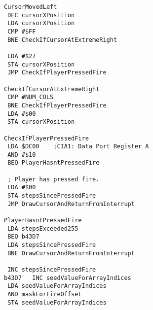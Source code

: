 \begin{minipage}[b]{0.33\linewidth}
\begin{lrbox}{\mybox}
\begin{lstlisting}[basicstyle=\ttfamily\tiny]
CursorMovedLeft   
 DEC cursorXPosition
 LDA cursorXPosition
 CMP #$FF
 BNE CheckIfCursorAtExtremeRight

 LDA #$27
 STA cursorXPosition
 JMP CheckIfPlayerPressedFire

CheckIfCursorAtExtremeRight   
 CMP #NUM_COLS
 BNE CheckIfPlayerPressedFire
 LDA #$00
 STA cursorXPosition

CheckIfPlayerPressedFire   
 LDA $DC00    ;CIA1: Data Port Register A
 AND #$10
 BEQ PlayerHasntPressedFire

 ; Player has pressed fire.
 LDA #$00
 STA stepsSincePressedFire
 JMP DrawCursorAndReturnFromInterrupt

PlayerHasntPressedFire   
 LDA stepsExceeded255
 BEQ b43D7
 LDA stepsSincePressedFire
 BNE DrawCursorAndReturnFromInterrupt

 INC stepsSincePressedFire
b43D7   INC seedValueForArrayIndices
 LDA seedValueForArrayIndices
 AND maskForFireOffset
 STA seedValueForArrayIndices

\end{lstlisting}
\end{lrbox}%
\scalebox{0.8}{\usebox{\mybox}}
\end{minipage}
\hspace{-0.1cm}
